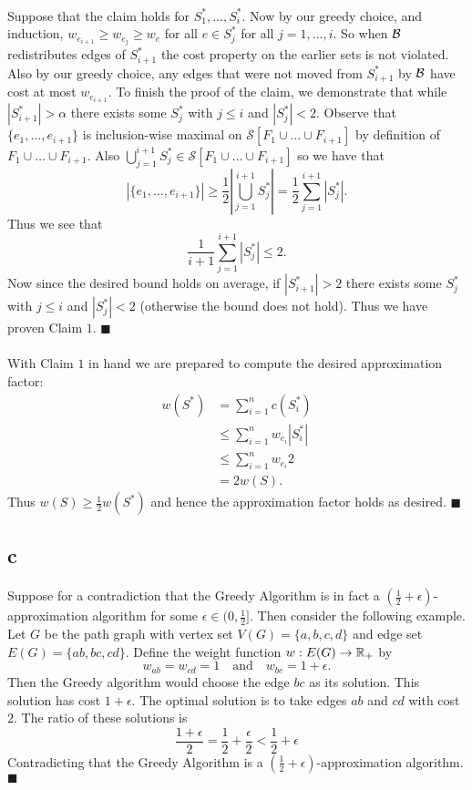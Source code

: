 \documentclass[letterpaper,12pt,oneside,onecolumn]{article}
\newcommand{\cS}{\mathcal{S}} \newcommand{\cT}{\mathcal{T}}
\begin{document}
\paragraph{}
Suppose that the claim holds for $S^*_1 ,\dots, S^*_i$. Now by our greedy choice, and induction, $w_{e_{i+1}} \geq w_{e_j} \geq w_e$ for all $e \in S^*_j$ for all $j = 1,\dots, i$. So when $\mathcal{B}$ redistributes edges of $S^*_{i+1}$ the cost property on the earlier sets is not violated. Also by our greedy choice, any edges that were not moved from $S^*_{i+1}$ by $\mathcal{B}$ have cost at most $w_{e_{i+1}}$. To finish the proof of the claim, we demonstrate that while $|S_{i+1}^*| > \alpha$ there exists some $S^*_j$ with $j\leq i$ and $|S^*_j| < 2$. Observe that $\{e_1, \dots, e_{i+1}\}$ is inclusion-wise maximal on $\cS[F_1 \cup \dots \cup F_{i+1}]$ by definition of $F_1 \cup \dots \cup F_{i+1}$. Also $\bigcup_{j=1}^{i+1} S^*_j \in \cS[F_1 \cup \dots \cup F_{i+1}]$ so we have that
$$|\{e_1, \dots, e_{i+1}\}| \geq \frac{1}{2} |\bigcup_{j=1}^{i+1} S^*_j | = \frac{1}{2} \sum_{j=1}^{i+1} |S^*_j|.$$
Thus we see that
$$ \frac{1}{i+1}\sum_{j=1}^{i+1} |S^*_j| \leq 2.$$
Now since the desired bound holds on average, if $|S^*_{i+1}| > 2$ there exists some $S^*_j$ with $j \leq i$ and $|S^*_j| < 2$ (otherwise the bound does not hold). Thus we have proven Claim $1$. $\blacksquare$
\paragraph{}
With Claim $1$ in hand we are prepared to compute the desired approximation factor:
\begin{align*}
w(S^*) &= \sum_{i=1}^n c(S^*_i) \\
&\leq \sum_{i=1}^n w_{e_i} |S^*_i| \\
&\leq \sum_{i=1}^n w_{e_i} 2 \\
&= 2 w(S).
\end{align*}
Thus $w(S) \geq \frac{1}{2} w(S^*)$ and hence the approximation factor holds as desired. $\blacksquare$
	\subsection{c}
	\paragraph{}
	Suppose for a contradiction that the Greedy Algorithm is in fact a $(\frac{1}{2} + \epsilon)$-approximation algorithm for some $\epsilon \in (0, \frac{1}{2}]$. Then consider the following example. Let $G$ be the path graph with vertex set $V(G) = \{a,b,c,d\}$ and edge set $E(G) = \{ab, bc,cd\}$. Define the weight function $w : E(G) \rightarrow \mathbb{R}_+$ by
	$$w_{ab} = w_{cd} = 1 \quad\text{and}\quad w_{bc} = 1+\epsilon.$$
	Then the Greedy algorithm would choose the edge $bc$ as its solution. This solution has cost $1+\epsilon$. The optimal solution is to take edges $ab$ and $cd$ with cost $2$. The ratio of these solutions is
	$$ \frac{1+\epsilon}{2} = \frac{1}{2} + \frac{\epsilon}{2} < \frac{1}{2} + \epsilon$$
	Contradicting that the Greedy Algorithm is a $(\frac{1}{2} + \epsilon)$-approximation algorithm. $\blacksquare$
\end{document}
